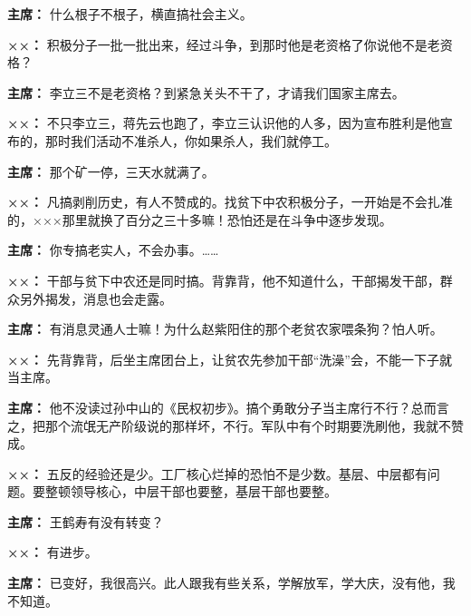 \begin{duihua}
\item[\textbf{主席：}] 什么根子不根子，横直搞社会主义。

\item[\textbf{××：}] 积极分子一批一批出来，经过斗争，到那时他是老资格了你说他不是老资格？

\item[\textbf{主席：}] 李立三不是老资格？到紧急关头不干了，才请我们国家主席去。

\item[\textbf{××：}] 不只李立三，蒋先云也跑了，李立三认识他的人多，因为宣布胜利是他宣布的，那时我们活动不准杀人，你如果杀人，我们就停工。

\item[\textbf{主席：}] 那个矿一停，三天水就满了。

\item[\textbf{××：}] 凡搞剥削历史，有人不赞成的。找贫下中农积极分子，一开始是不会扎准的，×××那里就换了百分之三十多嘛！恐怕还是在斗争中逐步发现。

\item[\textbf{主席：}] 你专搞老实人，不会办事。……

\item[\textbf{××：}] 干部与贫下中农还是同时搞。背靠背，他不知道什么，干部揭发干部，群众另外揭发，消息也会走露。

\item[\textbf{主席：}] 有消息灵通人士嘛！为什么赵紫阳住的那个老贫农家喂条狗？怕人听。

\item[\textbf{××：}] 先背靠背，后坐主席团台上，让贫农先参加干部“洗澡”会，不能一下子就当主席。

\item[\textbf{主席：}] 他不没读过孙中山的《民权初步》。搞个勇敢分子当主席行不行？总而言之，把那个流氓无产阶级说的那样坏，不行。军队中有个时期要洗刷他，我就不赞成。

\item[\textbf{××：}] 五反的经验还是少。工厂核心烂掉的恐怕不是少数。基层、中层都有问题。要整顿领导核心，中层干部也要整，基层干部也要整。

\item[\textbf{主席：}] 王鹤寿有没有转变？

\item[\textbf{××：}] 有进步。

\item[\textbf{主席：}] 已变好，我很高兴。此人跟我有些关系，学解放军，学大庆，没有他，我不知道。


\end{duihua}
